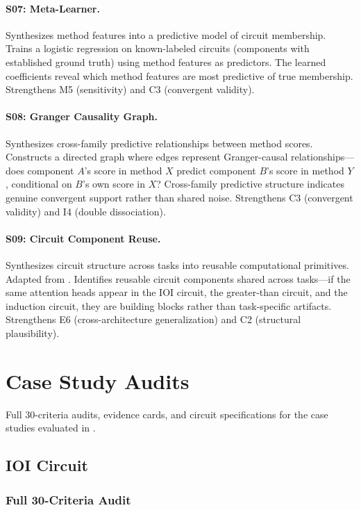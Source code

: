 \documentclass{article}
\begin{document}
\paragraph{S07: Meta-Learner.} Synthesizes method features into a predictive model of circuit membership. Trains a logistic regression on known-labeled circuits (components with established ground truth) using method features as predictors. The learned coefficients reveal which method features are most predictive of true membership. Strengthens M5 (sensitivity) and C3 (convergent validity).

\paragraph{S08: Granger Causality Graph.} Synthesizes cross-family predictive relationships between method scores. Constructs a directed graph where edges represent Granger-causal relationships---does component $A$'s score in method $X$ predict component $B$'s score in method $Y$, conditional on $B$'s own score in $X$? Cross-family predictive structure indicates genuine convergent support rather than shared noise. Strengthens C3 (convergent validity) and I4 (double dissociation).

\paragraph{S09: Circuit Component Reuse.} Synthesizes circuit structure across tasks into reusable computational primitives. Adapted from \citet{merullo2024circuit}. Identifies reusable circuit components shared across tasks---if the same attention heads appear in the IOI circuit, the greater-than circuit, and the induction circuit, they are building blocks rather than task-specific artifacts. Strengthens E6 (cross-architecture generalization) and C2 (structural plausibility).
\section{Case Study Audits}

Full 30-criteria audits, evidence cards, and circuit specifications for the case studies evaluated in .

\subsection{IOI Circuit}
\label{appendix:ioi-audit}

\subsubsection{Full 30-Criteria Audit}
\end{document}

